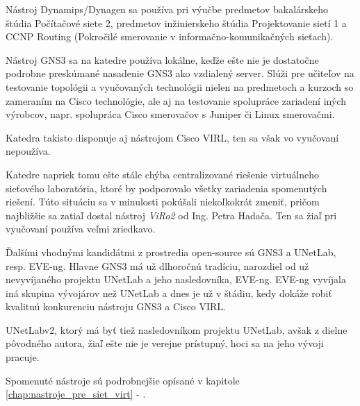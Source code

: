 Nástroj Dynamips/Dynagen sa používa pri výučbe predmetov bakalárskeho štúdia Počítačové siete 2, predmetov inžinierskeho štúdia Projektovanie sietí 1 a CCNP Routing (Pokročilé smerovanie v informačno-komunikačných sieťach).

Nástroj GNS3 sa na katedre používa lokálne, keďže ešte nie je dostatočne podrobne preskúmané nasadenie GNS3 ako vzdialený server. Slúži pre učiteľov na testovanie topológii a vyučovaných technológii nielen na predmetoch a kurzoch so zameraním na Cisco technológie, ale aj na testovanie spolupráce zariadení iných výrobcov, napr. spolupráca Cisco smerovačov s Juniper či Linux smerovačmi.

Katedra takisto disponuje aj nástrojom Cisco VIRL, ten sa však vo vyučovaní nepoužíva.

Katedre napriek tomu ešte stále chýba centralizované riešenie virtuálneho sieťového laboratória, ktoré by podporovalo všetky zariadenia spomenutých riešení. Túto situáciu sa v minulosti pokúšali niekoľkokrát zmeniť, pričom najbližšie sa zatiaľ dostal nástroj \emph{ViRo2} od Ing. Petra Hadača. Ten sa žiaľ pri vyučovaní používa veľmi zriedkavo.

Ďalšími vhodnými kandidátmi z prostredia open-source sú GNS3 a UNetLab, resp. EVE-ng. Hlavne GNS3 má už dlhoročnú tradíciu, narozdiel od už nevyvíjaného projektu UNetLab a jeho nasledovníka, EVE-ng. EVE-ng vyvíjala iná skupina vývojárov než UNetLab a dnes je už v štádiu, kedy dokáže robiť kvalitnú konkurenciu nástroju GNS3 a Cisco VIRL.

UNetLabv2, ktorý má byť tiež nasledovníkom projektu UNetLab, avšak z dielne pôvodného autora, žiaľ ešte nie je verejne prístupný, hoci sa na jeho vývoji pracuje.

Spomenuté nástroje sú podrobnejšie opísané v kapitole \ref{chap:nastroje_pre_siet_virt} - .
